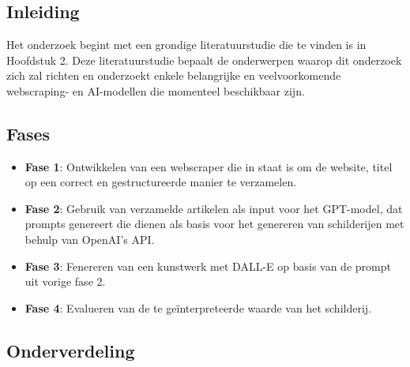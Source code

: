 
\chapter{}%
\label{ch:methodologie}

\section{Inleiding}
Het onderzoek begint met een grondige literatuurstudie die te vinden is in Hoofdstuk 2. Deze literatuurstudie bepaalt de onderwerpen waarop dit onderzoek zich zal richten en onderzoekt enkele belangrijke en veelvoorkomende webscraping- en AI-modellen die momenteel beschikbaar zijn.  \\

\section{Fases}
\begin{itemize}
    \item \textbf{Fase 1}: Ontwikkelen van een webscraper die in staat is om de website, titel op een correct en gestructureerde manier te verzamelen. 
    \item \textbf{Fase 2}: Gebruik van verzamelde artikelen als input voor het GPT-model, dat prompts genereert die dienen als basis voor het genereren van schilderijen met behulp van OpenAI's API.
    \item \textbf{Fase 3}: Fenereren van een kunstwerk met DALL-E op basis van de prompt uit vorige fase 2.
    \item \textbf{Fase 4}: Evalueren van de te geïnterpreteerde waarde van het schilderij. \\
\end{itemize} 

\section{Onderverdeling}

